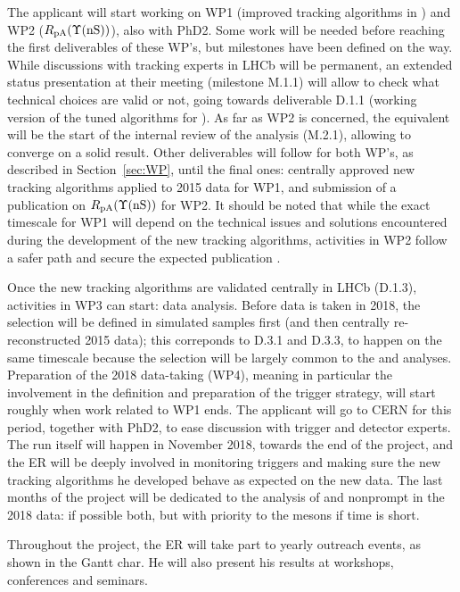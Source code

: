 \documentclass[a4paper,11pt]{article}
\newcommand{\ER}{ER\xspace}
\begin{document}
The applicant will start working on WP1 (improved tracking algorithms in \pbpb) and WP2 ($R_{\text{pA}}(\Upsilon\text{(nS)})$), also with PhD2. Some work will be needed before reaching the first deliverables of these WP's, but milestones have been defined on the way. While discussions with tracking experts in LHCb will be permanent, an extended status presentation at their meeting (milestone M.1.1) will allow to check what technical choices are valid or not, going towards deliverable D.1.1 (working version of the tuned algorithms for \pbpb). As far as WP2 is concerned, the equivalent will be the start of the internal review of the analysis (M.2.1), allowing to converge on a solid result. Other deliverables will follow for both WP's, as described in Section~\ref{sec:WP}, until the final ones: centrally approved new \pbpb tracking algorithms applied to 2015 \pbpb data for WP1, and submission of a publication on $R_{\text{pA}}(\Upsilon\text{(nS)})$ for WP2. It should be noted that while the exact timescale for WP1 will depend on the technical issues and solutions encountered during the development of the new tracking algorithms, activities in WP2 follow a safer path and secure the expected publication .

Once the new tracking algorithms are validated centrally in LHCb (D.1.3), activities in WP3 can start: \pbpb data analysis. Before \pbpb data is taken in 2018, the selection will be defined in simulated samples first (and then centrally re-reconstructed 2015 \pbpb data); this correponds to D.3.1 and D.3.3, to happen on the same timescale because the selection will be largely common to the \Dz and \JPsi analyses. Preparation of the 2018 \pbpb data-taking (WP4), meaning in particular the involvement in the definition and preparation of the trigger strategy, will start roughly when work related to WP1 ends. The applicant will go to CERN for this period, together with PhD2, to ease discussion with trigger and detector experts. The \pbpb run itself will happen in November 2018, towards the end of the project, and the \ER will be deeply involved in monitoring triggers and making sure the new \pbpb tracking algorithms he developed behave as expected on the new data. The last months of the project will be dedicated to the analysis of \Dz and nonprompt \JPsi in the 2018 \pbpb data: if possible both, but with priority to the \Dz mesons if time is short.

Throughout the project, the \ER will take part to yearly outreach events, as shown in the Gantt char. He will also present his results at workshops, conferences and seminars.
\end{document}
